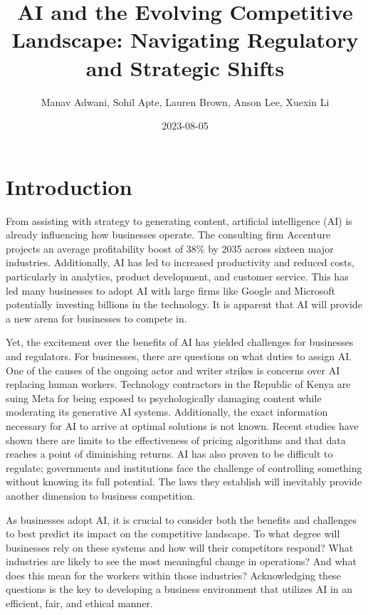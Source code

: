 \documentclass[
]{book}
\title{AI and the Evolving Competitive Landscape: Navigating Regulatory and Strategic Shifts}
\author{Manav Adwani, Sohil Apte, Lauren Brown, Anson Lee, Xuexin Li}
\date{2023-08-05}
\begin{document}
\maketitle

{
\setcounter{tocdepth}{1}
\tableofcontents
}
\hypertarget{introduction}{%
\chapter{Introduction}\label{introduction}}

From assisting with strategy to generating content, artificial intelligence (AI) is already influencing how businesses operate. The consulting firm Accenture projects an average profitability boost of 38\% by 2035 across sixteen major industries. Additionally, AI has led to increased productivity and reduced costs, particularly in analytics, product development, and customer service. This has led many businesses to adopt AI with large firms like Google and Microsoft potentially investing billions in the technology. It is apparent that AI will provide a new arena for businesses to compete in.

Yet, the excitement over the benefits of AI has yielded challenges for businesses and regulators. For businesses, there are questions on what duties to assign AI. One of the causes of the ongoing actor and writer strikes is concerns over AI replacing human workers. Technology contractors in the Republic of Kenya are suing Meta for being exposed to psychologically damaging content while moderating its generative AI systems. Additionally, the exact information necessary for AI to arrive at optimal solutions is not known. Recent studies have shown there are limits to the effectiveness of pricing algorithms and that data reaches a point of diminishing returns. AI has also proven to be difficult to regulate; governments and institutions face the challenge of controlling something without knowing its full potential. The laws they establish will inevitably provide another dimension to business competition.

As businesses adopt AI, it is crucial to consider both the benefits and challenges to best predict its impact on the competitive landscape. To what degree will businesses rely on these systems and how will their competitors respond? What industries are likely to see the most meaningful change in operations? And what does this mean for the workers within those industries? Acknowledging these questions is the key to developing a business environment that utilizes AI in an efficient, fair, and ethical manner.
\end{document}
